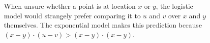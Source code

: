 \documentclass{article}
\begin{document}
\begin{figure}
 \caption{\label{fig:exp} When unsure whether a point is at location $x$ or $y$, the logistic model would strangely prefer comparing it to $u$ and $v$ over $x$ and $y$ themselves.  The exponential model makes this prediction because $(x-y) \cdot (u-v) > (x-y)\cdot (x-y)$.}
\end{figure}
\end{document}
